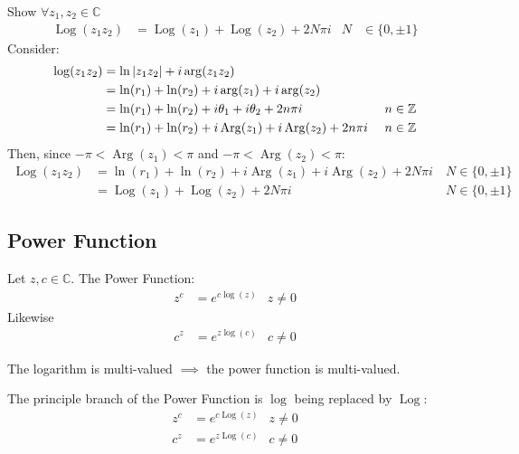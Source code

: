 \documentclass[12pt, english]{book}
\begin{document}
	\begin{example}
		Show \(\forall z_1, z_2 \in \mathbb{C}\)
		\begin{align*}
			\operatorname{Log}(z_1 z_2) &= \operatorname{Log}(z_1) + \operatorname{Log}(z_2) + 2N\pi i & N &\in \{0, \pm 1\}
		\end{align*}
		{\color{Grey}
		Consider:
		\begin{align*}
			\log(z_1 z_2) 
			&= \ln\abs{z_1 z_2} + i\arg(z_1 z_2) \\
			&= \ln(r_1) + \ln(r_2) + i\arg(z_1) + i\arg(z_2) \\
			&= \ln(r_1) + \ln(r_2) + i\theta_1 + i\theta_2 + 2n\pi i & \ n\in \mathbb{Z} \\
			&= \ln(r_1) + \ln(r_2) + i\operatorname{Arg}(z_1) + i\operatorname{Arg}(z_2) + 2n \pi i & \ n\in \mathbb{Z}
		\end{align*}
		Then, since \(-\pi < \operatorname{Arg}(z_1)<\pi\) and \(-\pi < \operatorname{Arg}(z_2)<\pi\):
		\begin{align*}
			\operatorname{Log}(z_1 z_2) 
			&= \ln(r_1) + \ln(r_2) + i\operatorname{Arg}(z_1) + i\operatorname{Arg}(z_2) + 2N \pi i & \ N\in \{0, \pm 1\} \\
			&=\operatorname{Log}(z_1) + \operatorname{Log}(z_2) + 2N \pi i & \ N\in \{0, \pm 1\} 
		\end{align*}
		}
	\end{example}

	\subsection{Power Function} \label{Power Function Subsection - Complex}
	
	\begin{definition}
		\label{Power Function Definition - Complex}
		Let \(z, c \in \mathbb{C}\). The Power Function: 
		\begin{align*}
			z^c &= e^{c \log(z)} & z\neq 0
		\end{align*}
		Likewise
		\begin{align*}
			c^z &= e^{z \log(c)} & c\neq 0
		\end{align*}
	\end{definition}
	The logarithm is multi-valued \(\implies\) the power function is multi-valued.
	
	The principle branch of the Power Function is \(\log\) being replaced by \(\operatorname{Log}\):
	\begin{align*}
		z^c &= e^{c \operatorname{Log}(z)} & z\neq 0 \\
		c^z &= e^{z \operatorname{Log}(c)} & c\neq 0
	\end{align*}
\end{document}
